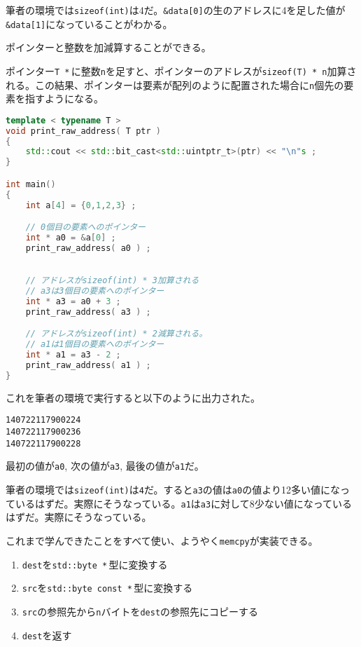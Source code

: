 筆者の環境では\texttt{sizeof(int)}は4だ。\texttt{\&data[0]}の生のアドレスに4を足した値が\,\texttt{\&data[1]}になっていることがわかる。


ポインターと整数を加減算することができる。

ポインター\texttt{T *}\,に整数\texttt{n}を足すと、ポインターのアドレスが\texttt{sizeof(T) * n}加算される。この結果、ポインターは要素が配列のように配置された場合に\texttt{n}個先の要素を指すようになる。

\begin{lstlisting}[language={C++}]
template < typename T >
void print_raw_address( T ptr )
{
    std::cout << std::bit_cast<std::uintptr_t>(ptr) << "\n"s ;
}

int main()
{
    int a[4] = {0,1,2,3} ;

    // 0個目の要素へのポインター
    int * a0 = &a[0] ;
    print_raw_address( a0 ) ;
    

    // アドレスがsizeof(int) * 3加算される
    // a3は3個目の要素へのポインター
    int * a3 = a0 + 3 ;
    print_raw_address( a3 ) ;

    // アドレスがsizeof(int) * 2減算される。
    // a1は1個目の要素へのポインター
    int * a1 = a3 - 2 ;
    print_raw_address( a1 ) ;
}
\end{lstlisting}

これを筆者の環境で実行すると以下のように出力された。

\begin{lstlisting}[style=terminal]
140722117900224
140722117900236
140722117900228
\end{lstlisting}

最初の値が\texttt{a0}, 次の値が\texttt{a3}, 最後の値が\texttt{a1}だ。

筆者の環境では\texttt{sizeof(int)}は\texttt{4}だ。すると\texttt{a3}の値は\texttt{a0}の値より12多い値になっているはずだ。実際にそうなっている。\texttt{a1}は\texttt{a3}に対して8少ない値になっているはずだ。実際にそうなっている。


これまで学んできたことをすべて使い、ようやく\texttt{memcpy}が実装できる。

\begin{enumerate}
\def\labelenumi{\arabic{enumi}.}
\item
  \texttt{dest}を\texttt{std::byte *}\,型に変換する
\item
  \texttt{src}を\texttt{std::byte const *}\,型に変換する
\item
  \texttt{src}の参照先から\texttt{n}バイトを\texttt{dest}の参照先にコピーする
\item
  \texttt{dest}を返す
\end{enumerate}

